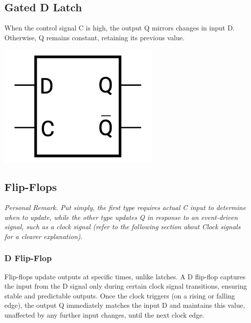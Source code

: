 \documentclass[12pt,openany]{book}
\begin{document}
\subsection{Gated D Latch}

\begin{minipage}{0.45\textwidth}
\begin{justify}
When the control signal C is high, the output Q mirrors changes in input D. Otherwise, Q remains constant, retaining its previous value.
\end{justify}
\end{minipage}
\hfill
\vline
\hfill
\begin{minipage}{0.45\textwidth}
	\begin{center}
		\includegraphics[width=0.6\textwidth]{circuits/12.2.1.png}
	\end{center}
\end{minipage}
\subsection{Flip-Flops}
\textit{Personal Remark. Put simply, the first type requires actual C input to determine when to update, while the other type updates Q in response to an event-driven signal, such as a clock signal (refer to the following section about Clock signals for a clearer explanation).}\newline
\subsubsection{D Flip-Flop}
Flip-flops update outputs at specific times, unlike latches. A D flip-flop captures the input from the D signal only during certain clock signal transitions, ensuring stable and predictable outputs. Once the clock triggers (on a rising or falling edge), the output Q immediately matches the input D and maintains this value, unaffected by any further input changes, until the next clock edge.
\vspace*{10px}
\end{document}
